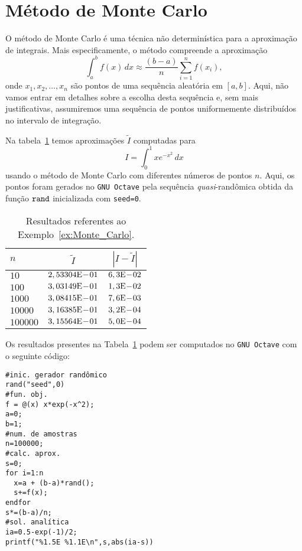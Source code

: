 \section{Método de Monte Carlo}\label{cap_integr_sec_Monte_Carlo}

O método de Monte Carlo é uma técnica não determinística para a aproximação de integrais. Mais especificamente, o método compreende a aproximação
\begin{equation}
  \int_a^b f(x)\,dx \approx \frac{(b-a)}{n}\sum_{i=1}^n f(x_i),
\end{equation}
onde $x_1, x_2, \dotsc, x_n$ são pontos de uma sequência aleatória em $[a, b]$. Aqui, não vamos entrar em detalhes sobre a escolha desta sequência e, sem mais justificativas, assumiremos uma sequência de pontos uniformemente distribuídos no intervalo de integração.

\begin{ex}\label{ex:Monte_Carlo}
  Na tabela~\ref{tab:ex_Monte_Carlo} temos aproximações $\tilde{I}$ computadas para
  \begin{equation}
    I = \int_0^1 xe^{-x^2}\,dx
  \end{equation}
usando o método de Monte Carlo com diferentes números de pontos $n$. Aqui, os pontos foram gerados no \verb+GNU Octave+ pela sequência {\it quasi}-randômica obtida da função $\verb+rand+$ inicializada com \verb+seed=0+.

\begin{table}[h!]
  \centering
  \begin{tabular}{l|cc}
    $n$ & $\tilde{I}$ & $|I-\tilde{I}|$\\\hline
    $10$ & $2,53304\mathrm{E}\!-\!01$ & $6,3\mathrm{E}\!-\!02$\\
    $100$ & $3,03149\mathrm{E}\!-\!01$ & $1,3\mathrm{E}\!-\!02$ \\
    $1000$ & $3,08415\mathrm{E}\!-\!01$ & $7,6\mathrm{E}\!-\!03$ \\
    $10000$ & $3,16385\mathrm{E}\!-\!01$ & $3,2\mathrm{E}\!-\!04$ \\
    $100000$ & $3,15564\mathrm{E}\!-\!01$ & $5,0\mathrm{E}\!-\!04$ \\\hline
  \end{tabular}
  \caption{Resultados referentes ao Exemplo~\ref{ex:Monte_Carlo}.}
  \label{tab:ex_Monte_Carlo}
\end{table}

\ifisoctave
Os resultados presentes na Tabela~\ref{tab:ex_Monte_Carlo} podem ser computados no \verb+GNU Octave+ com o seguinte código:
\begin{verbatim}
#inic. gerador randômico
rand("seed",0)
#fun. obj.
f = @(x) x*exp(-x^2);
a=0;
b=1;
#num. de amostras
n=100000;
#calc. aprox.
s=0;
for i=1:n
  x=a + (b-a)*rand();
  s+=f(x);
endfor
s*=(b-a)/n;
#sol. analítica
ia=0.5-exp(-1)/2;
printf("%1.5E %1.1E\n",s,abs(ia-s))
\end{verbatim}
\fi
\end{ex}

